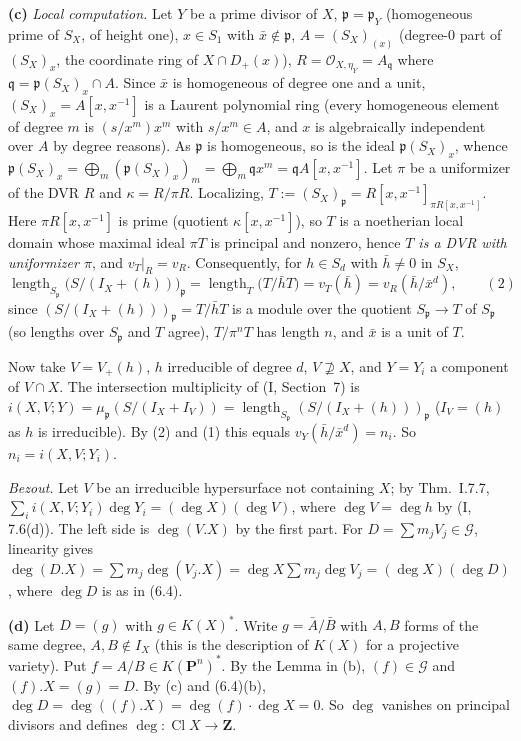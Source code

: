 \documentclass[11pt]{article}
\begin{document}
\textbf{(c)} \emph{Local computation.} Let $Y$ be a prime divisor of $X$, $\mathfrak p=\mathfrak p_Y$ (homogeneous prime of $S_X$, of height one), $x\in S_1$ with $\bar x\notin\mathfrak p$, $A=(S_X)_{(x)}$ (degree-$0$ part of $(S_X)_x$, the coordinate ring of $X\cap D_+(x)$), $R=\mathcal O_{X,\eta_Y}=A_{\mathfrak q}$ where $\mathfrak q=\mathfrak p(S_X)_x\cap A$. Since $\bar x$ is homogeneous of degree one and a unit, $(S_X)_x=A[x,x^{-1}]$ is a Laurent polynomial ring (every homogeneous element of degree $m$ is $(s/x^m)x^m$ with $s/x^m\in A$, and $x$ is algebraically independent over $A$ by degree reasons). As $\mathfrak p$ is homogeneous, so is the ideal $\mathfrak p(S_X)_x$, whence $\mathfrak p(S_X)_x=\bigoplus_m(\mathfrak p(S_X)_x)_m=\bigoplus_m\mathfrak q x^m=\mathfrak qA[x,x^{-1}]$. Let $\pi$ be a uniformizer of the DVR $R$ and $\kappa=R/\pi R$. Localizing, $T:=(S_X)_{\mathfrak p}=R[x,x^{-1}]_{\pi R[x,x^{-1}]}$. Here $\pi R[x,x^{-1}]$ is prime (quotient $\kappa[x,x^{-1}]$), so $T$ is a noetherian local domain whose maximal ideal $\pi T$ is principal and nonzero, hence \emph{$T$ is a DVR with uniformizer $\pi$}, and $v_T|_R=v_R$. Consequently, for $h\in S_d$ with $\bar h\ne0$ in $S_X$,
\[
\operatorname{length}_{S_{\mathfrak p}}\bigl(S/(I_X+(h))\bigr)_{\mathfrak p}=\operatorname{length}_T\bigl(T/\bar hT\bigr)=v_T(\bar h)=v_R(\bar h/\bar x^d),\qquad(2)
\]
since $(S/(I_X+(h)))_{\mathfrak p}=T/\bar hT$ is a module over the quotient $S_{\mathfrak p}\to T$ of $S_{\mathfrak p}$ (so lengths over $S_{\mathfrak p}$ and $T$ agree), $T/\pi^nT$ has length $n$, and $\bar x$ is a unit of $T$.

Now take $V=V_+(h)$, $h$ irreducible of degree $d$, $V\not\supseteq X$, and $Y=Y_i$ a component of $V\cap X$. The intersection multiplicity of (I, Section~7) is $i(X,V;Y)=\mu_{\mathfrak p}(S/(I_X+I_V))=\operatorname{length}_{S_{\mathfrak p}}(S/(I_X+(h)))_{\mathfrak p}$ ($I_V=(h)$ as $h$ is irreducible). By (2) and (1) this equals $v_Y(\bar h/\bar x^d)=n_i$. So $n_i=i(X,V;Y_i)$.

\emph{Bezout.} Let $V$ be an irreducible hypersurface not containing $X$; by Thm.~I.7.7, $\sum_ii(X,V;Y_i)\deg Y_i=(\deg X)(\deg V)$, where $\deg V=\deg h$ by (I, 7.6(d)). The left side is $\deg(V.X)$ by the first part. For $D=\sum m_jV_j\in\mathcal G$, linearity gives $\deg(D.X)=\sum m_j\deg(V_j.X)=\deg X\sum m_j\deg V_j=(\deg X)(\deg D)$, where $\deg D$ is as in (6.4).

\textbf{(d)} Let $D=(g)$ with $g\in K(X)^*$. Write $g=\bar A/\bar B$ with $A,B$ forms of the same degree, $A,B\notin I_X$ (this is the description of $K(X)$ for a projective variety). Put $f=A/B\in K(\mathbf P^n)^*$. By the Lemma in (b), $(f)\in\mathcal G$ and $(f).X=(g)=D$. By (c) and (6.4)(b), $\deg D=\deg((f).X)=\deg(f)\cdot\deg X=0$. So $\deg$ vanishes on principal divisors and defines $\deg:\operatorname{Cl}X\to\mathbf Z$.
\end{document}
